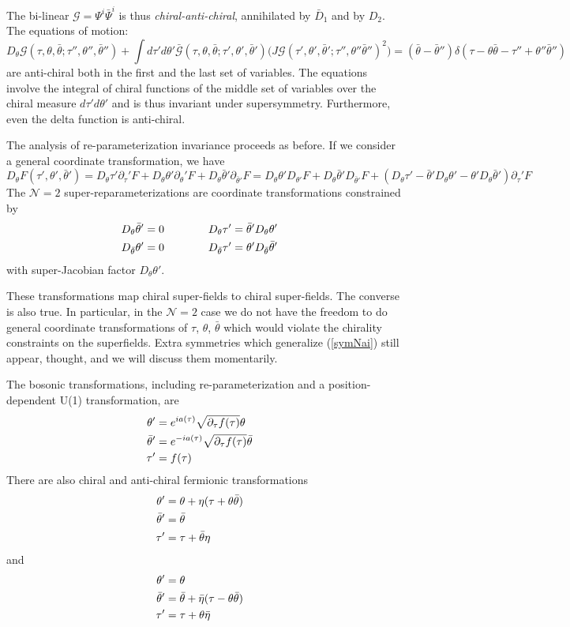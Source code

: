 \documentclass[aps,pre,preprint,onecolumn,citeautoscript,superscriptaddress,nofootinbib,eqsecnum]{revtex4-1}
\newcommand{\beq}{\begin{equation}}
\newcommand{\eeq}{\end{equation}}
\begin{document}
The bi-linear $\mathcal{G} = \Psi^i \bar \Psi^i$ is thus {\it chiral-anti-chiral}, annihilated by $\bar D_1$ and by $D_2$. 
The equations of motion:
\beq 
D_\theta \mathcal{G}(\tau,\theta, \bar \theta ;\tau'',\theta'', \bar \theta'')+\int d\tau'd\theta' \mathcal{\bar G}(\tau,\theta,\bar \theta;\tau',\theta',\bar \theta')\big(J \mathcal{G}(\tau',\theta',\bar \theta';\tau'',\theta''\bar \theta'')^2\big)=(\bar \theta-\bar \theta'')\delta(\tau- \theta \bar \theta -\tau'' + \theta'' \bar \theta'')\label{EOMN2}
\eeq
are anti-chiral both in the first and the last set of variables. The equations involve the integral of chiral functions of the middle set of variables over the chiral measure $d\tau'd\theta'$ and is thus invariant under supersymmetry. Furthermore, 
even the delta function is  anti-chiral.

The analysis of re-parameterization invariance proceeds as before. 
If we consider a general coordinate transformation, we have 
\begin{equation}
D_\theta F(\tau',\theta', \bar \theta') = D_\theta \tau' \partial_\tau' F + D_\theta \theta' \partial_\theta' F + D_\theta \bar \theta' \partial_{\bar \theta'} F 
= D_\theta\theta' D_{\theta'} F + D_\theta \bar \theta' D_{\bar \theta'} F + \left(D_\theta \tau' - \bar \theta' D_\theta\theta'- \theta' D_\theta\bar \theta'  \right)\partial_\tau' F
\end{equation}
The $\mathcal{N}=2$ super-reparameterizations are coordinate transformations constrained by 
\begin{align}
D_\theta \bar \theta' &= 0 \qquad \qquad D_\theta \tau' = \bar \theta' D_\theta\theta'   \cr
D_{\bar \theta} \theta' &= 0 \qquad \qquad D_{\bar \theta} \tau' = \theta' D_{\bar \theta} \bar \theta'  
\end{align}
with super-Jacobian factor $D_\theta \theta'$.  

These transformations map chiral super-fields to chiral super-fields. The converse is also true. In particular, 
in the $\mathcal{N}=2$ case we do not have the freedom to do general coordinate transformations of $\tau$, $\theta$, $\bar \theta$ which would violate the chirality constraints on the 
superfields. Extra symmetries which generalize (\ref{symNai}) still appear, thought, and we will discuss them momentarily. 

The bosonic transformations, including re-parameterization and a position-dependent 
U(1) transformation, are 
\begin{align}
\theta' &= e^{i a(\tau)} \sqrt{\partial_\tau f(\tau)} \theta \cr
\bar \theta' &= e^{-i a(\tau)} \sqrt{\partial_\tau f(\tau)} \bar \theta \cr
\tau' &= f(\tau) 
\end{align}
There are also chiral and anti-chiral fermionic transformations
\begin{align}
\theta' &= \theta + \eta(\tau + \theta \bar \theta) \cr
\bar \theta' &= \bar \theta \cr
\tau' &= \tau +  \bar \theta \eta 
\end{align}
and 
\begin{align}
\theta' &= \theta \cr
\bar \theta' &= \bar \theta + \bar \eta(\tau - \theta \bar \theta) \cr
\tau' &= \tau +  \theta  \bar \eta 
\end{align}
\end{document}
